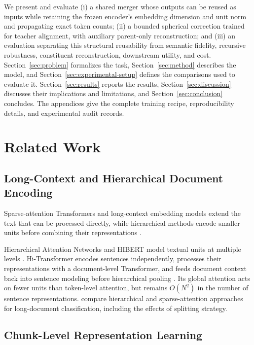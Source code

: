 \documentclass[10pt]{article}
\begin{document}
We present and evaluate (i) a shared merger whose outputs can be reused as inputs
while retaining the frozen encoder's embedding dimension and unit norm and
propagating exact token counts; (ii) a bounded spherical correction trained for
teacher alignment, with auxiliary parent-only reconstruction; and (iii) an
evaluation separating this structural reusability from semantic fidelity,
recursive robustness, constituent reconstruction, downstream utility, and cost.
Section~\ref{sec:problem} formalizes the task, Section~\ref{sec:method}
describes the model, and Section~\ref{sec:experimental-setup} defines the
comparisons used to evaluate it. Section~\ref{sec:results} reports the results,
Section~\ref{sec:discussion} discusses their implications and limitations, and
Section~\ref{sec:conclusion} concludes. The appendices give the complete training
recipe, reproducibility details, and experimental audit records.

\section{Related Work}

\subsection{Long-Context and Hierarchical Document Encoding}

Sparse-attention Transformers and long-context embedding models extend the
text that can be processed directly, while hierarchical methods encode smaller
units before combining their representations
\citep{beltagy-etal-2020-longformer,zaheer-etal-2020-bigbird,gunther-etal-2023-jina-embeddings-2,dai-etal-2022-revisiting}.

Hierarchical Attention Networks and HIBERT model textual units at multiple
levels \citep{yang-etal-2016-hierarchical,zhang-etal-2019-hibert}.
Hi-Transformer encodes sentences independently, processes their representations
with a document-level Transformer, and feeds document context back into sentence
modeling before hierarchical pooling \citep{wu-etal-2021-hi}. Its global
attention acts on fewer units than token-level attention, but remains
\(O(N^2)\) in the number of sentence representations. \citet{dai-etal-2022-revisiting} compare
hierarchical and sparse-attention approaches for long-document classification,
including the effects of splitting strategy.

\subsection{Chunk-Level Representation Learning}
\end{document}
